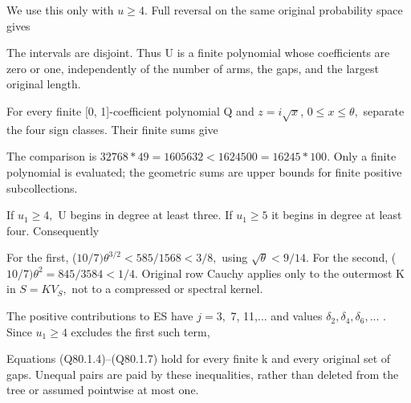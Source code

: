 
We use this only with \(u\ge 4.\) Full reversal on the same original
probability space gives


The intervals are disjoint. Thus U is a finite polynomial whose
coefficients are zero or one, independently of the number of arms,
the gaps, and the largest original length. 

For every finite [0, 1]-coefficient polynomial Q and \(z=i \sqrt{x}\),
\(0\le x\le \theta,\allowbreak \) separate the four sign classes. Their finite sums give


The comparison is \(32768*49=1605632<1624500=16245*100.\)
Only a finite polynomial is evaluated; the geometric sums are upper
bounds for finite positive subcollections.

If \(u_1\ge 4,\allowbreak \) U begins in degree at least three. If \(u_1\ge 5\) it begins
in degree at least four. Consequently


For the first, (\(10/7)\theta^{3/2}<585/1568<3/8,\allowbreak \) using
\(\sqrt{\theta}<9/14.\) For the second,
(\(10/7)\theta^2=845/3584<1/4.\) Original row Cauchy applies only
to the outermost K in \(S=KV_S,\allowbreak \) not to a compressed or spectral kernel.

The positive contributions to ES have \(j=3,\allowbreak \) 7, 11,... and values
\(\delta_2,\allowbreak  \delta_4,\allowbreak  \delta_6,\allowbreak ...\) . Since \(u_1\ge 4\) excludes the first such term,


Equations (Q80.1.4)--(Q80.1.7) hold for every finite k and every original
set of gaps. Unequal pairs are paid by these inequalities, rather
than deleted from the tree or assumed pointwise at most one.

